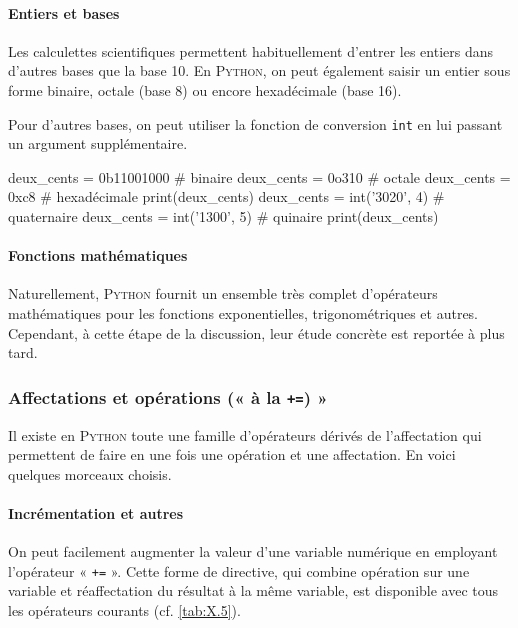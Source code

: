 \vspace{1pt}

\paragraph{Entiers et bases} Les calculettes scientifiques permettent habituellement d'entrer les entiers dans d'autres bases que la base 10. En \textsc{Python}, on peut également saisir un entier sous forme binaire, octale (base 8) ou encore hexadécimale (base 16).

Pour d'autres bases, on peut utiliser la fonction de conversion \texttt{int} en lui passant un argument supplémentaire.

\begin{idleconsole}
	\begin{pyconsole}
		deux_cents = 0b11001000     # binaire
		deux_cents = 0o310          # octale
		deux_cents = 0xc8           # hexadécimale
		print(deux_cents)
		deux_cents = int('3020', 4) # quaternaire
		deux_cents = int('1300', 5) # quinaire
		print(deux_cents)
	\end{pyconsole}
\end{idleconsole}

\vspace{1pt}

\paragraph{Fonctions mathématiques} Naturellement, \textsc{Python} fournit un ensemble très complet d'opérateurs mathématiques pour les fonctions exponentielles, trigonométriques et autres. Cependant, à cette étape de la discussion, leur étude concrète est reportée à plus tard.

\subsubsection[Affectations et opérations]{Affectations et opérations (« à la \texttt{+=}) »}
\label{subsub:X.3.1.3}

Il existe en \textsc{Python} toute une famille d'opérateurs dérivés de l'affectation qui permettent de faire en une fois une opération et une affectation. En voici quelques morceaux choisis.

\paragraph{Incrémentation et autres} On peut facilement augmenter la valeur d'une variable numérique en employant \nopagebreak l'opérateur « \texttt{+=} ». 
Cette forme de directive, qui combine opération sur une variable et réaffectation du résultat à la même variable, est disponible avec tous les opérateurs courants (cf. \cref{tab:X.5}).

